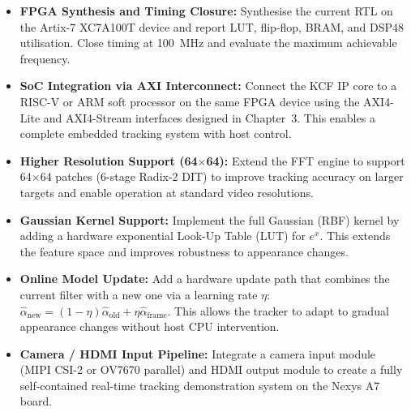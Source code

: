 \documentclass[a4paper,12pt]{report}
\begin{document}
\begin{itemize}
    \item \textbf{FPGA Synthesis and Timing Closure:} Synthesise the current RTL on the Artix-7 XC7A100T device and report LUT, flip-flop, BRAM, and DSP48 utilisation. Close timing at 100~MHz and evaluate the maximum achievable frequency.
    \item \textbf{SoC Integration via AXI Interconnect:} Connect the KCF IP core to a RISC-V or ARM soft processor on the same FPGA device using the AXI4-Lite and AXI4-Stream interfaces designed in Chapter~3. This enables a complete embedded tracking system with host control.
    \item \textbf{Higher Resolution Support (64$\times$64):} Extend the FFT engine to support 64$\times$64 patches (6-stage Radix-2 DIT) to improve tracking accuracy on larger targets and enable operation at standard video resolutions.
    \item \textbf{Gaussian Kernel Support:} Implement the full Gaussian (RBF) kernel by adding a hardware exponential Look-Up Table (LUT) for $e^x$. This extends the feature space and improves robustness to appearance changes.
    \item \textbf{Online Model Update:} Add a hardware update path that combines the current filter with a new one via a learning rate $\eta$: $\hat{\alpha}_\text{new} = (1-\eta)\hat{\alpha}_\text{old} + \eta\hat{\alpha}_\text{frame}$. This allows the tracker to adapt to gradual appearance changes without host CPU intervention.
    \item \textbf{Camera / HDMI Input Pipeline:} Integrate a camera input module (MIPI CSI-2 or OV7670 parallel) and HDMI output module to create a fully self-contained real-time tracking demonstration system on the Nexys A7 board.
\end{itemize}

\pagebreak
\nocite{danelljan2014}


\end{document}
